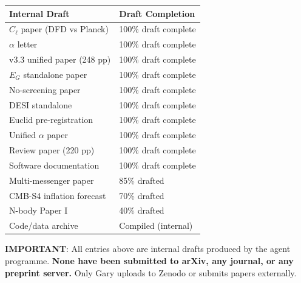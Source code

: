 \documentclass[11pt,a4paper]{article}
\begin{document}
\begin{center}
\begin{tabular}{ll}
\toprule
\textbf{Internal Draft} & \textbf{Draft Completion} \\
\midrule
$C_\ell$ paper (DFD vs Planck) & 100\% draft complete \\
$\alpha$ letter & 100\% draft complete \\
v3.3 unified paper (248 pp) & 100\% draft complete \\
$E_G$ standalone paper & 100\% draft complete \\
No-screening paper & 100\% draft complete \\
DESI standalone & 100\% draft complete \\
Euclid pre-registration & 100\% draft complete \\
Unified $\alpha$ paper & 100\% draft complete \\
Review paper (220 pp) & 100\% draft complete \\
Software documentation & 100\% draft complete \\
Multi-messenger paper & 85\% drafted \\
CMB-S4 inflation forecast & 70\% drafted \\
N-body Paper I & 40\% drafted \\
Code/data archive & Compiled (internal) \\
\bottomrule
\end{tabular}
\end{center}

\noindent\textbf{IMPORTANT}: All entries above are internal drafts produced by the agent programme. \textbf{None have been submitted to arXiv, any journal, or any preprint server.} Only Gary uploads to Zenodo or submits papers externally.
\end{document}

